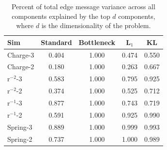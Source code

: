 \documentclass[11pt]{article}
\begin{document}
    \begin{table}[H]
        \centering
        \begin{tabular}{lcccc}
        \hline
        Sim & Standard & Bottleneck & L$_1$ & KL \\
        \hline
        Charge-3 & 0.404 & 1.000 & 0.474 & 0.550 \\
        Charge-2 & 0.180 & 1.000 & 0.263 & 0.667 \\
        r$^{-2}$-3 & 0.583 & 1.000 & 0.795 & 0.925 \\
        r$^{-2}$-2 & 0.374 & 1.000 & 0.525 & 0.712 \\
        r$^{-1}$-3 & 0.877 & 1.000 & 0.743 & 0.719 \\
        r$^{-1}$-2 & 0.591 & 1.000 & 0.925 & 0.990 \\
        Spring-3 & 0.889 & 1.000 & 0.999  & 0.993 \\
        Spring-2 & 0.737 & 1.000 & 1.000 & 0.989 \\
        \hline
        \end{tabular}
        \caption{Percent of total edge message variance across all components explained by the top $d$ components, where $d$ is the dimensionality of the problem.}
        \label{tab:scarcity}
    \end{table}
\end{document}
